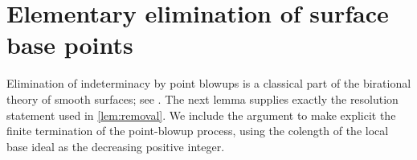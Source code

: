 
\section{Elementary elimination of surface base points}
\label{app:surface}

Elimination of indeterminacy by point blowups is a classical part of
the birational theory of smooth surfaces; see \cite{Bea96}. The next
lemma supplies exactly the resolution statement used in
\cref{lem:removal}. We include the argument to make explicit the finite
termination of the point-blowup process, using the colength of the local
base ideal as the decreasing positive integer.


